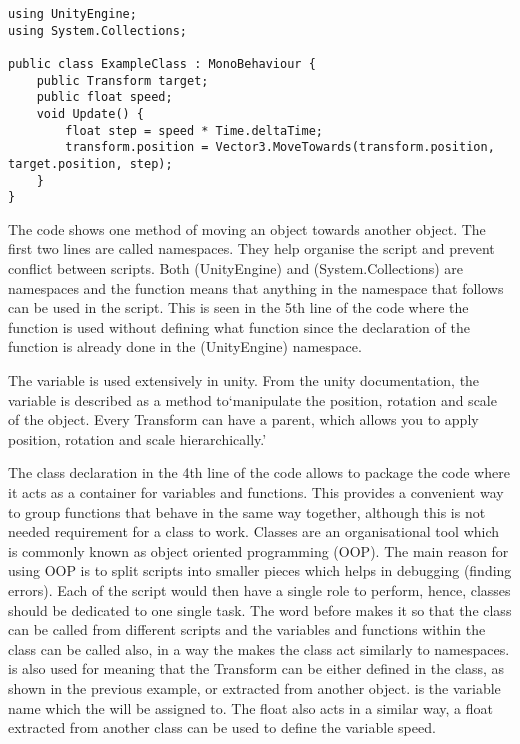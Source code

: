 \begin{verbatim}
using UnityEngine;
using System.Collections;

public class ExampleClass : MonoBehaviour {
    public Transform target;
    public float speed;
    void Update() {
        float step = speed * Time.deltaTime;
        transform.position = Vector3.MoveTowards(transform.position, target.position, step);
    }
}
\end{verbatim}


The code shows one method of moving an object towards another object. The first two lines are called namespaces. They help organise the script and prevent conflict between scripts. Both (UnityEngine) and (System.Collections) are namespaces and the  function means that anything in the namespace that follows can be used in the script. This is seen in the 5th line of the code where the  function is used without defining what function since the declaration of the function is already done in the (UnityEngine) namespace. 

The  variable is used extensively in unity. From the unity documentation, the  variable is described as a method to`manipulate the position, rotation and scale of the object. Every Transform can have a parent, which allows you to apply position, rotation and scale hierarchically.'

The class declaration in the 4th line of the code allows to package the code where it acts as a container for variables and functions. This provides a convenient way to group functions that behave in the same way together, although this is not needed requirement for a class to work. Classes are an organisational tool which is commonly known as object oriented programming (OOP). The main reason for using OOP is to split scripts into smaller pieces which helps in debugging (finding errors). Each of the script would then have a single role to perform, hence, classes should be dedicated to one single task. The word  before  makes it so that the class can be called from different scripts and the variables and functions within the class can be called also, in a way the  makes the class act similarly to namespaces.  is also used for  meaning that the Transform can be either defined in the class, as shown in the previous example, or extracted from another object.  is the variable name which the  will be assigned to. The float  also acts in a similar way, a float extracted from another class can be used to define the variable speed.

